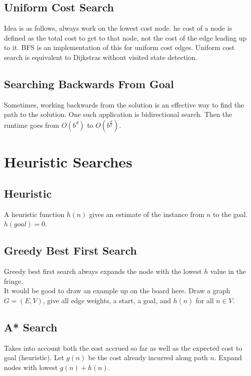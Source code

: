 \documentclass[letterpaper]{article} %
\begin{document}
\subsection{Uniform Cost Search}

Idea is as follows, always work on the lowest cost node. he cost of a node is defined as the total cost to get to that node, not the cost of the edge leading up to it. BFS is an implementation of this for uniform cost edges. Uniform cost search is equivalent to Dijkstras without visited state detection.

\subsection{Searching Backwards From Goal}

Sometimes, working backwards from the solution is an effective way to find the path to the solution. One such application is bidirectional search. Then the runtime goes from $O(b^{d})$ to $O(b^{\frac{d}{2}})$.

\section{Heuristic Searches}

\subsection{Heuristic}

A heuristic function $h(n)$ gives an estimate of the instance from $n$ to the goal. $h(goal) = 0$. 

\subsection{Greedy Best First Search}

Greedy best first search always expands the node with the lowest $h$ value in the fringe.\\

It would be good to draw an example up on the board here. Draw a graph $G = (E,V)$, give all edge weights, a start, a goal, and $h(n)$ for all $n \in V$.

\subsection{A* Search}

Takes into account both the cost accrued so far as well as the expected cost to goal (heuristic). Let $g(n)$ be the cost already incurred along path $n$. Expand nodes with lowest $g(n) + h(n)$.\\
\end{document}
